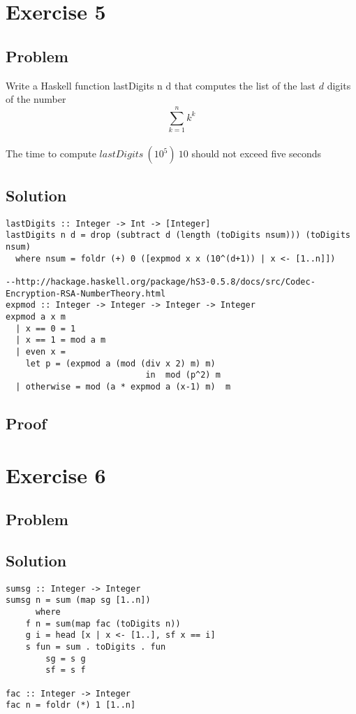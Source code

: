 \documentclass[a4paper,11pt]{article}
\begin{document}
\section{Exercise 5}
\subsection{Problem}
Write a Haskell function lastDigits n d that computes the list of the last $d$ digits of the number
\begin{equation}
\sum\limits_{k=1}^n k^k
\end{equation}
\\
The time to compute $lastDigits\: (10^5)\: 10$ should not exceed five seconds

\subsection{Solution}

\begin{lstlisting}
lastDigits :: Integer -> Int -> [Integer]
lastDigits n d = drop (subtract d (length (toDigits nsum))) (toDigits nsum)
  where nsum = foldr (+) 0 ([expmod x x (10^(d+1)) | x <- [1..n]])

--http://hackage.haskell.org/package/hS3-0.5.8/docs/src/Codec-Encryption-RSA-NumberTheory.html
expmod :: Integer -> Integer -> Integer -> Integer
expmod a x m
  | x == 0 = 1
  | x == 1 = mod a m
  | even x =
    let p = (expmod a (mod (div x 2) m) m)
                            in  mod (p^2) m
  | otherwise = mod (a * expmod a (x-1) m)  m 
\end{lstlisting}

\subsection{Proof}

\section{Exercise 6}
\subsection{Problem}

\subsection{Solution}

\begin{lstlisting}
sumsg :: Integer -> Integer
sumsg n = sum (map sg [1..n])
      where
	f n = sum(map fac (toDigits n))
	g i = head [x | x <- [1..], sf x == i]
	s fun = sum . toDigits . fun
      	sg = s g
      	sf = s f

fac :: Integer -> Integer
fac n = foldr (*) 1 [1..n]
\end{lstlisting}
\end{document}
